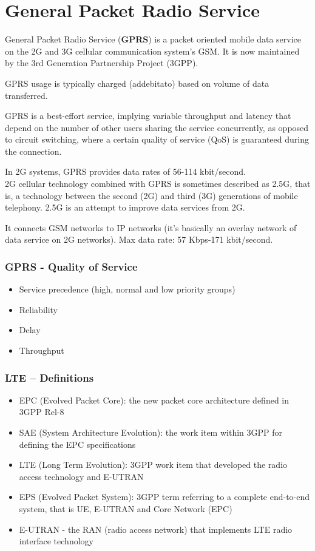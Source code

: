 \section{General Packet Radio Service}
\label{sec:gprs}

General Packet Radio Service (\textbf{GPRS}) is a packet oriented mobile data
service on the 2G and 3G cellular communication system's GSM. It is now
maintained by the 3rd Generation Partnership Project (3GPP).

GPRS usage is typically charged (addebitato) based on volume of data
transferred.

GPRS is a best-effort service, implying variable throughput and latency that
depend on the number of other users sharing the service concurrently, as
opposed to circuit switching, where a certain quality of service (QoS) is
guaranteed during the connection.

In 2G systems, GPRS provides data rates of 56-114 kbit/second. \\

2G cellular technology combined with GPRS is sometimes described as 2.5G,
that is, a technology between the second (2G) and third (3G) generations of
mobile telephony. 2.5G is an attempt to improve data services from
2G.

It connects GSM networks to IP networks (it's basically an overlay network of
data service on 2G networks). Max data rate: 57 Kbps-171 kbit/second.

\subsubsection{GPRS - Quality of Service}
\begin{itemize}
  \item Service precedence (high, normal and low priority groups)
  \item Reliability
  \item Delay
  \item Throughput
\end{itemize}

\subsubsection{LTE – Definitions}

\begin{itemize}
  \item EPC (Evolved Packet Core): the new packet core architecture defined in
3GPP Rel-8
  \item SAE (System Architecture Evolution): the work item within 3GPP for
defining the EPC specifications
  \item LTE (Long Term Evolution): 3GPP work item that developed the radio
access technology and E-UTRAN
  \item EPS (Evolved Packet System): 3GPP term referring to a complete
end-to-end system, that is UE, E-UTRAN and Core Network (EPC)
  \item E-UTRAN - the RAN (radio access network) that implements LTE radio
interface technology
\end{itemize}

